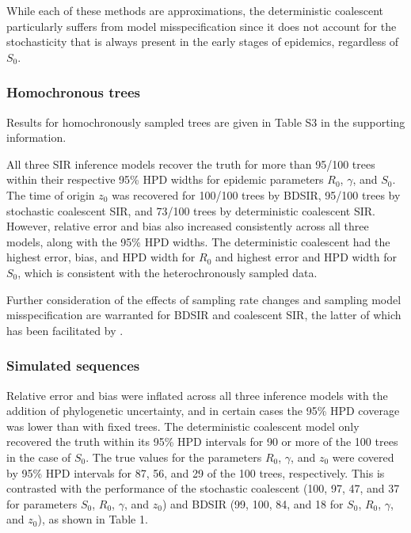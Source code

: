 \documentclass[12pt,titlepage]{article}
\begin{document}
While each of these methods are approximations, the deterministic coalescent particularly suffers from model misspecification since it does not account for the stochasticity that is always present in the early stages of epidemics, regardless of $S_0$.

\subsubsection{Homochronous trees} Results for homochronously sampled trees are given in Table S3 in the supporting information.  

All three SIR inference models recover the truth for more than 95/100 trees within their respective 95\% HPD widths for epidemic parameters $R_{0}$, $\gamma$, and $S_{0}$.  The time of origin $z_{0}$ was recovered for 100/100 trees by BDSIR, 95/100 
trees by stochastic coalescent SIR, and 73/100 trees by deterministic coalescent SIR.  However, relative error and bias also increased consistently across all three models, along with the 95\% HPD widths.  
The deterministic coalescent had the highest error, bias, and HPD width for $R_0$ and highest error and HPD width for $S_0$, which is consistent with the heterochronously sampled data.  

Further consideration of the effects of sampling rate changes and sampling model misspecification are warranted for BDSIR and coalescent SIR, the latter of which has been facilitated by \cite{VolzFrost:2014}.

\subsubsection{Simulated sequences} Relative error and bias were inflated across all three inference models with the addition of phylogenetic uncertainty, and in certain cases the 95\% HPD coverage was lower than with fixed trees.  The 
deterministic coalescent model only recovered the truth within its 95\% HPD intervals for 90 or more of the 100 trees in the case of $S_0$.  The true values for the parameters $R_{0}$, $\gamma$, and $z_{0}$ were covered by 95\% HPD intervals for 87, 56, and 29 of the 100 trees, respectively.  
This is contrasted with the performance of the stochastic coalescent (100, 97, 47, and 37 for parameters $S_{0}$, $R_{0}$, $\gamma$, and $z_{0}$) and BDSIR (99, 100, 84, and 18 for $S_{0}$, $R_{0}$, $\gamma$, and $z_{0}$), as shown in Table 1.
\end{document}

